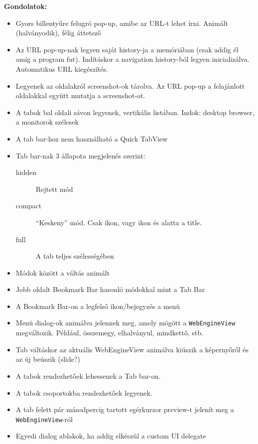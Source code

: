 \documentclass[12pt]{report}
\begin{document}
\noindent
\textbf{Gondolatok:}
\begin{itemize}
    \item Gyors billentyűre felugró pop-up, amibe az URL-t lehet írni. Animált (halványodik),
        félig áttetsző
    \item Az URL pop-up-nak legyen saját history-ja a memóriában (csak addig él amíg a
        program fut). Indításkor a navigation history-ból legyen inicializálva.
        Automatikus URL kiegészítés.
    \item Legyenek az oldalakról screenshot-ok tárolva. Az URL pop-up a felajánlott oldalakkal
        együtt mutatja a screenshot-ot.
    \item A tabok bal oldali sávon legyenek, vertikális listában. Indok: desktop browser,
        a monitorok szélesek
    \item A tab bar-hoz nem használható a Quick TabView
    \item Tab bar-nak 3 állapota megjelenés szerint:
        \begin{description}
            \item[hidden] Rejtett mód
            \item[compact] ``Keskeny'' mód. Csak ikon, vagy ikon és alatta a title.
            \item[full] A tab teljes szélességében
        \end{description}
    \item Módok között a váltás animált
    \item Jobb oldalt Bookmark Bar hasonló módokkal mint a Tab Bar
    \item A Bookmark Bar-on a legfelső ikon/bejegyzés a menü
    \item Menü dialog-ok animálva jelennek meg, amely mögött a \texttt{WebEngineView}
        megváltozik. Például, összemegy, elhalványul, mindkettő, stb.
    \item Tab váltáskor az aktuális WebEngineView animálva kiúszik a képernyőről és az
        új beúszik (slide?)
    \item A tabok rendezhetőek lehessenek a Tab bar-on.
    \item A tabok csoportokba rendezhetőek legyenek.
    \item A tab felett pár másodpercig tartott egérkurzor preview-t jelenít meg a \\
        \texttt{WebEngineView}-ról
    \item Egyedi dialog ablakok, ha addig elkészül a custom UI delegate
\end{itemize}
\end{document}
